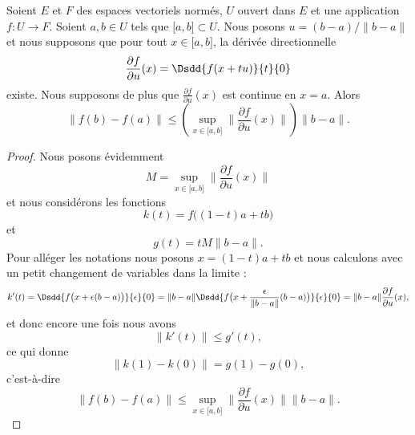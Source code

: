 \begin{proposition} \label{ProFSjmBAt}
	Soient \( E\) et \( F\) des espaces vectoriels normés, \( U \) ouvert dans \( E\) et une application \( f\colon U\to F\). Soient \( a,b\in U\) tels que \( \mathopen[ a , b \mathclose]\subset U\). Nous posons \( u=(b-a)/\| b-a \|\) et nous supposons que pour tout \( x\in\mathopen[ a , b \mathclose]\), la dérivée directionnelle
	\begin{equation}
		\frac{ \partial f }{ \partial u }(x)=\Dsdd{ f(x+tu) }{t}{0}
	\end{equation}
	existe. Nous supposons de plus que \( \frac{ \partial f }{ \partial u }(x)\) est continue en \( x=a\). Alors
	\begin{equation}
		\| f(b)-f(a) \|\leq\left( \sup_{x\in\mathopen[ a , b \mathclose]}\| \frac{ \partial f }{ \partial u }(x) \| \right)\| b-a \|.
	\end{equation}
\end{proposition}

\begin{proof}
	Nous posons évidemment
	\begin{equation}
		M=\sup_{x\in\mathopen[ a , b \mathclose]}\| \frac{ \partial f }{ \partial u }(x) \|
	\end{equation}
	et nous considérons les fonctions
	\begin{equation}
		k(t)=f\big( (1-t)a+tb \big)
	\end{equation}
	et
	\begin{equation}
		g(t)=tM\| b-a \|.
	\end{equation}
	Pour alléger les notations nous posons \( x=(1-t)a+tb\) et nous calculons avec un petit changement de variables dans la limite :
	\begin{equation}
		k'(t)=\Dsdd{  f\big( x+\epsilon(b-a) \big)  }{\epsilon}{0}=\| b-a \|\Dsdd{ f\big( x+\frac{ \epsilon }{ \| b-a \| }(b-a) \big) }{\epsilon}{0}=\| b-a \|\frac{ \partial f }{ \partial u }(x),
	\end{equation}
	et donc encore une fois nous avons
	\begin{equation}
		\| k'(t) \|\leq g'(t),
	\end{equation}
	ce qui donne
	\begin{equation}
		\| k(1)-k(0) \|=g(1)-g(0),
	\end{equation}
	c'est-à-dire
	\begin{equation}
		\| f(b)-f(a) \|\leq \sup_{x\in\mathopen[ a , b \mathclose]}\| \frac{ \partial f }{ \partial u }(x) \|\| b-a \|.
	\end{equation}
\end{proof}

